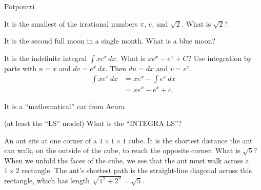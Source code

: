 \documentclass{article}
\begin{document}
\begin{category}{Potpourri}

  \begin{clue}[say]
    It is the smallest of the irrational numbers $\pi$, $e$, and $\sqrt{2}$.
  \response
    What is $\sqrt{2}$?
  \end{clue}

  \begin{clue}[say]
    It is the second full moon in a single month.
  \response
    What is a blue moon?
  \end{clue}

  \begin{clue}[write]
    It is the indefinite integral $\displaystyle \int xe^x \, dx$.
  \response
    What is $xe^x-e^x+C$?
  \solution
    Use integration by parts with $u=x$ and $dv=e^x\,dx$. Then $du=dx$ and $v=e^x$,
    \begin{align*}
    \int xe^x\,dx
    &=xe^x-\int e^x\,dx \\
    &=xe^x-e^x+c.
    \end{align*}
  \end{clue}

  \begin{clue}[say]
    It is a ``mathematical'' car from Acura

    (at least the ``LS'' model)
  \response
    What is the ``INTEGRA LS''?
  \end{clue}

  \begin{clue}[say]
    An ant sits at one corner of a $1\times 1\times 1$ cube. It is the shortest distance the ant can walk, on the outside of the cube, to reach the opposite corner.
  \response
    What is $\sqrt{5}$?
  \solution
    When we unfold the faces of the cube, we see that the ant must walk across a $1\times 2$ rectangle. The ant's shortest path is the straight-line diagonal across this rectangle, which has length $\sqrt{1^2+2^2}=\sqrt{5}$.
  \end{clue}

\end{category}
\end{document}
